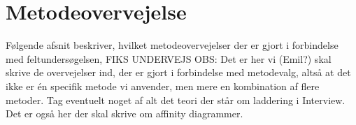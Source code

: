 \section{Metodeovervejelse}
\label{ParametreMetodeovervejelser}
%
Følgende afsnit beskriver, hvilket metodeovervejelser der er gjort i forbindelse med feltundersøgelsen, FIKS UNDERVEJS\blankline
%
OBS: Det er her vi (Emil?) skal skrive de overvejelser ind, der er gjort i forbindelse med metodevalg, altså at det ikke er én specifik metode vi anvender, men mere en kombination af flere metoder. Tag eventuelt noget af alt det teori der står om laddering i Interview. Det er også her der skal skrive om affinity diagrammer.\blankline
% 

